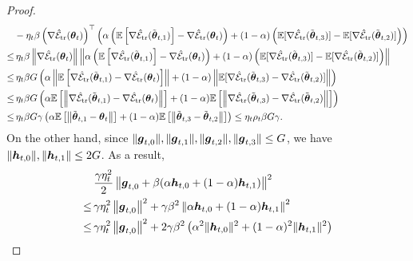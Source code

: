 \begin{proof}
\begin{equation}
\begin{aligned}
            & - \eta_t\beta\left(\nabla \hat{\mathcal{E}}_{{\text{tr}}}(\boldsymbol{\theta}_t)\right)^{\top}\left(\alpha\left(\mathbb{E}\left[\nabla \hat{\mathcal{E}}_{{\text{tr}}}(\tilde{\boldsymbol{\theta}}_{t,1})\right] - \nabla \hat{\mathcal{E}}_{{\text{tr}}}(\boldsymbol{\theta}_t)\right) + (1-\alpha)\left(\mathbb{E}[\nabla \hat{\mathcal{E}}_{{\text{tr}}}(\tilde{\boldsymbol{\theta}}_{t,3})] - \mathbb{E}[\nabla \hat{\mathcal{E}}_{{\text{tr}}}(\tilde{\boldsymbol{\theta}}_{t,2})]\right)\right) \\
            \le & \, \eta_t \beta \left\|\nabla \hat{\mathcal{E}}_{{\text{tr}}}(\boldsymbol{\theta}_t)\right\|\left\|\alpha\left(\mathbb{E}\left[\nabla\hat{\mathcal{E}}_{{\text{tr}}}(\tilde{\boldsymbol{\theta}}_{t,1})\right] - \nabla\hat{\mathcal{E}}_{{\text{tr}}}(\boldsymbol{\theta}_t)\right) + (1-\alpha)\left(\mathbb{E}[\nabla\hat{\mathcal{E}}_{{\text{tr}}}(\tilde{\boldsymbol{\theta}}_{t,3})] - \mathbb{E}[\nabla\hat{\mathcal{E}}_{{\text{tr}}}(\tilde{\boldsymbol{\theta}}_{t,2})]\right)\right\| \\
            \le & \, \eta_t \beta G\left(\alpha \left\|\mathbb{E}\left[\nabla\hat{\mathcal{E}}_{{\text{tr}}}(\tilde{\boldsymbol{\theta}}_{t,1}) - \nabla\hat{\mathcal{E}}_{{\text{tr}}}(\boldsymbol{\theta}_t)\right]\right\| + (1-\alpha)\left\|\mathbb{E}[\nabla\hat{\mathcal{E}}_{{\text{tr}}}(\tilde{\boldsymbol{\theta}}_{t,3}) - \nabla\hat{\mathcal{E}}_{{\text{tr}}}(\tilde{\boldsymbol{\theta}}_{t,2})]\right\|\right) \\
            \le & \, \eta_t \beta G\left(\alpha \mathbb{E}\left[\left\|\nabla\hat{\mathcal{E}}_{{\text{tr}}}(\tilde{\boldsymbol{\theta}}_{t,1}) - \nabla\hat{\mathcal{E}}_{{\text{tr}}}(\boldsymbol{\theta}_t)\right\|\right] + (1-\alpha)\mathbb{E}\left[\left\|\nabla\hat{\mathcal{E}}_{{\text{tr}}}(\tilde{\boldsymbol{\theta}}_{t,3}) - \nabla\hat{\mathcal{E}}_{{\text{tr}}}(\tilde{\boldsymbol{\theta}}_{t,2})\right\|\right]\right) \\
            \le & \, \eta_t \beta G\gamma\left(\alpha \mathbb{E}\left[\left\|\tilde{\boldsymbol{\theta}}_{t,1} - \boldsymbol{\theta}_t\right\|\right] + (1 - \alpha)\mathbb{E}\left[\left\|\tilde{\boldsymbol{\theta}}_{t,3} - \tilde{\boldsymbol{\theta}}_{t,2}\right\|\right]\right) \le \eta_t \rho_t \beta G\gamma.
        \end{aligned}
    \end{equation}
    On the other hand, since $\|\boldsymbol{g}_{t,0}\|, \|\boldsymbol{g}_{t,1}\|, \|\boldsymbol{g}_{t,2}\|, \|\boldsymbol{g}_{t,3}\| \le G$, we have $\|\boldsymbol{h}_{t,0}\|, \|\boldsymbol{h}_{t,1}\| \le 2G$. As a result,
    \begin{equation} \label{eq:proof-gradient-3}
        \begin{aligned}
            & \, \frac{\gamma\eta_t^2}{2}\left\|\bfg_{t,0} + \beta(\alpha \bfh_{t,0} + (1-\alpha)\bfh_{t,1})\right\|^2 \\
            \le & \, \gamma\eta_t^2\left\|\bfg_{t,0}\right\|^2 + \gamma\beta^2 \left\|\alpha \bfh_{t,0} + (1-\alpha)\bfh_{t,1}\right\|^2 \\
            \le & \, \gamma\eta_t^2 \left\|\bfg_{t,0}\right\|^2 + 2\gamma\beta^2\left(\alpha^2\|\bfh_{t,0}\|^2 + (1-\alpha)^2\|\bfh_{t,1}\|^2\right) \\

\end{aligned}
\end{equation}
\end{proof}
